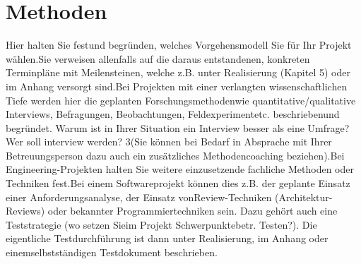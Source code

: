 \chapter{Methoden}


Hier halten Sie festund begründen, welches Vorgehensmodell Sie für Ihr Projekt wählen.Sie verweisen allenfalls auf die daraus entstandenen, konkreten Terminpläne mit Meilensteinen, welche z.B. unter Realisierung (Kapitel 5) oder im Anhang versorgt sind.Bei Projekten mit einer verlangten wissenschaftlichen Tiefe werden hier die geplanten Forschungsmethodenwie quantitative/qualitative Interviews, Befragungen, Beobachtungen, Feldexperimentetc. beschriebenund begründet. Warum ist in Ihrer Situation ein Interview besser als eine Umfrage? Wer soll interview werden?  
3(Sie können bei Bedarf in Absprache mit Ihrer Betreuungsperson dazu auch ein zusätzliches Methodencoaching beziehen).Bei Engineering-Projekten halten Sie weitere einzusetzende fachliche Methoden oder Techniken fest.Bei einem Softwareprojekt können dies z.B. der geplante Einsatz einer Anforderungsanalyse, der Einsatz vonReview-Techniken (Architektur-Reviews) oder bekannter Programmiertechniken sein. Dazu gehört auch eine Teststrategie (wo setzen Sieim Projekt Schwerpunktebetr. Testen?). Die eigentliche Testdurchführung ist dann unter Realisierung, im Anhang oder einemselbstständigen Testdokument beschrieben.